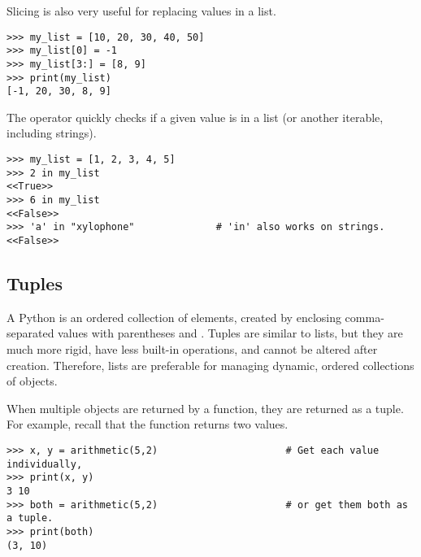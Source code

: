 Slicing is also very useful for replacing values in a list.

\begin{lstlisting}
>>> my_list = [10, 20, 30, 40, 50]
>>> my_list[0] = -1
>>> my_list[3:] = [8, 9]
>>> print(my_list)
[-1, 20, 30, 8, 9]
\end{lstlisting}

The  operator quickly checks if a given value is in a list (or another iterable, including strings).

\begin{lstlisting}
>>> my_list = [1, 2, 3, 4, 5]
>>> 2 in my_list
<<True>>
>>> 6 in my_list
<<False>>
>>> 'a' in "xylophone"              # 'in' also works on strings.
<<False>>
\end{lstlisting}

\subsection*{Tuples} %

A Python  is an ordered collection of elements, created by enclosing comma-separated values with parentheses \li{(} and \li{)}.
Tuples are similar to lists, but they are much more rigid, have less built-in operations, and cannot be altered after creation.
Therefore, lists are preferable for managing dynamic, ordered collections of objects.

When multiple objects are returned by a function, they are returned as a tuple.
For example, recall that the  function returns two values.

\begin{lstlisting}
>>> x, y = arithmetic(5,2)                      # Get each value individually,
>>> print(x, y)
3 10
>>> both = arithmetic(5,2)                      # or get them both as a tuple.
>>> print(both)
(3, 10)
\end{lstlisting}

